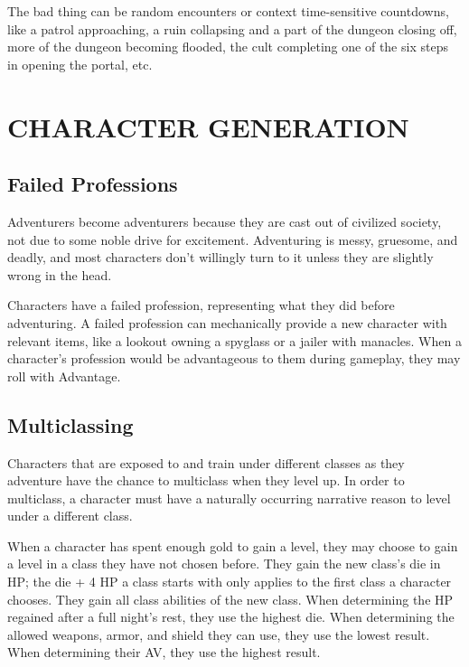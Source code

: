 \documentclass[twoside]{article}
\begin{document}
\bigbreak

The bad thing can be random encounters or context time-sensitive countdowns, like a patrol approaching, a ruin collapsing and a part of the dungeon closing off, more of the dungeon becoming flooded, the cult completing one of the six steps in opening the portal, etc.

\section*{CHARACTER GENERATION}

\subsection*{Failed Professions}

Adventurers become adventurers because they are cast out of civilized society, not due to some noble drive for excitement. Adventuring is messy, gruesome, and deadly, and most characters don't willingly turn to it unless they are slightly wrong in the head. 

\bigbreak

Characters have a failed profession, representing what they did before adventuring. A failed profession can mechanically provide a new character with relevant items, like a lookout owning a spyglass or a jailer with manacles. When a character's profession would be advantageous to them during gameplay, they may roll with Advantage.

\subsection*{Multiclassing}

Characters that are exposed to and train under different classes as they adventure have the chance to multiclass when they level up. In order to multiclass, a character must have a naturally occurring narrative reason to level under a different class.

\bigbreak

When a character has spent enough gold to gain a level, they may choose to gain a level in a class they have not chosen before. They gain the new class's die in HP; the die + 4 HP a class starts with only applies to the first class a character chooses. They gain all class abilities of the new class. When determining the HP regained after a full night's rest, they use the highest die. When determining the allowed weapons, armor, and shield they can use, they use the lowest result. When determining their AV, they use the highest result. 
\end{document}
